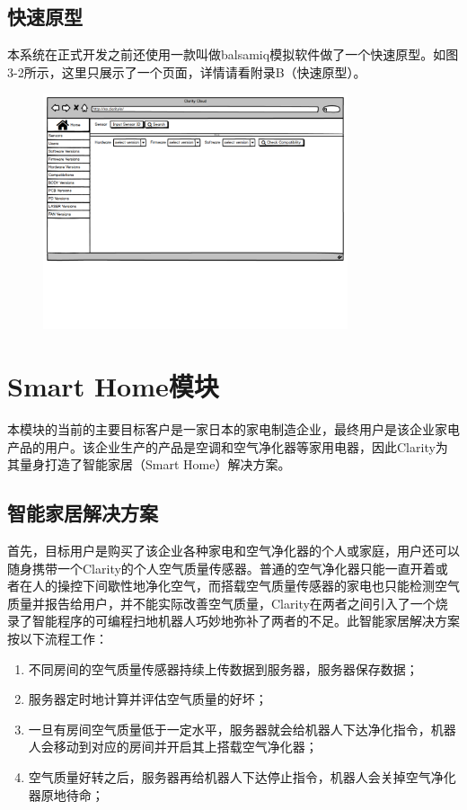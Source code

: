 \subsection{快速原型}
本系统在正式开发之前还使用一款叫做balsamiq模拟软件做了一个快速原型。如图3-2所示，这里只展示了一个页面，详情请看附录B（快速原型）。
\begin{figure}[!htp]
 \centering
 \includegraphics[width=0.8\textwidth,page=8]{pdf/balanar_prototype.pdf}
\end{figure}

\section{Smart Home模块}
本模块的当前的主要目标客户是一家日本的家电制造企业，最终用户是该企业家电产品的用户。该企业生产的产品是空调和空气净化器等家用电器，因此Clarity为其量身打造了智能家居（Smart Home）解决方案。
\subsection{智能家居解决方案}
首先，目标用户是购买了该企业各种家电和空气净化器的个人或家庭，用户还可以随身携带一个Clarity的个人空气质量传感器。普通的空气净化器只能一直开着或者在人的操控下间歇性地净化空气，而搭载空气质量传感器的家电也只能检测空气质量并报告给用户，并不能实际改善空气质量，Clarity在两者之间引入了一个烧录了智能程序的可编程扫地机器人巧妙地弥补了两者的不足。此智能家居解决方案按以下流程工作：
\begin{enumerate}
  \item 不同房间的空气质量传感器持续上传数据到服务器，服务器保存数据；
  \item 服务器定时地计算并评估空气质量的好坏；
  \item 一旦有房间空气质量低于一定水平，服务器就会给机器人下达净化指令，机器人会移动到对应的房间并开启其上搭载空气净化器；
  \item 空气质量好转之后，服务器再给机器人下达停止指令，机器人会关掉空气净化器原地待命；
\end{enumerate}
